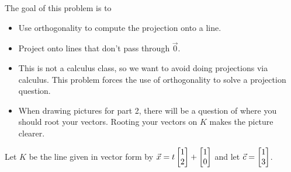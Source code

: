 	\begin{bookonly}\singlegrid\end{bookonly}
	\bookonlynewpage
	\question
	\begin{annotation}
		\begin{goals}

			The goal of this problem is to
			\begin{itemize}
				\item Use orthogonality to compute the projection onto a line.
				\item Project onto lines that don't pass through $\vec 0$.
			\end{itemize}
		\end{goals}

		\begin{notes}
			\begin{itemize}
				\item This is not a calculus class, so we want to avoid
					doing projections via calculus. This problem forces
					the use of orthogonality to solve a projection question.
				\item When drawing pictures for part 2, there will be a question
					of where you should root your vectors. Rooting your vectors
					on $K$ makes the picture clearer.
			\end{itemize}
		\end{notes}
	\end{annotation}
	Let $K$ be the line given in vector form by $\vec x=t\mat{1\\2}+\mat{1\\0}$ and let
	$\vec c=\mat{1\\3}$.
